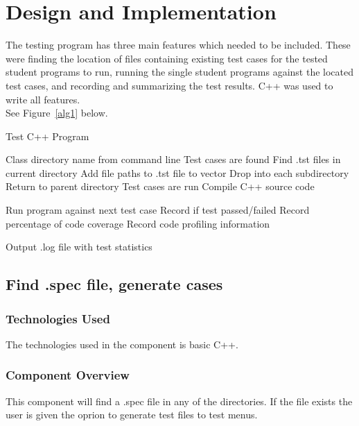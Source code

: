 \chapter{Design  and Implementation}
The testing program has three main features which needed to be included. These were finding the location of files containing existing test cases for the tested student programs to run, running the single student programs  against the located test cases, and recording and summarizing the test results. C++ was used to write all features.
\\ See Figure~\ref{alg1} below.

\begin{algorithm} [tbh]                     %
\caption{Test C++ Program}          %
\label{alg1}                           %
\begin{algorithmic}                    %
    \REQUIRE Class directory name from command line
    \ENSURE Test cases are found
        \STATE Find .tst files in current directory
        \STATE Add file paths to .tst file to vector
        \STATE Drop into each subdirectory
    \ELSE
        \STATE Return to parent directory
    \ENDIF
    \ENSURE Test cases are run
    \STATE Compile C++ source code
        
        \STATE Run program against next test case
        \STATE Record if test passed/failed
	\STATE Record percentage of code coverage
		\STATE Record code profiling information
	\ENDIF
        
    \ENDWHILE
    \STATE Output .log file with test statistics
\end{algorithmic}
\end{algorithm}
 

\section{Find .spec file, generate cases}
\subsection{Technologies Used}
The technologies used in the component is basic C++.

\subsection{Component Overview}
This component will find a .spec file in any of the directories. If the file exists the user is given the oprion to generate test files to test menus.

